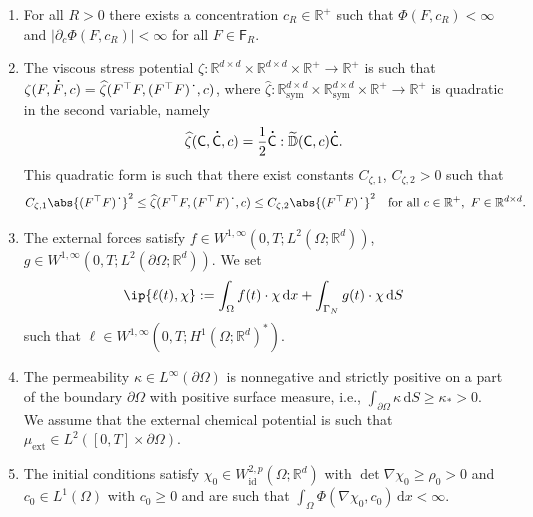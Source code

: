 \documentclass[a4paper,12pt]{article}
\newcommand{\ext}{\mathrm{ext}}
\newcommand{\R}{\mathbb{R}}
\newcommand{\pl}{\partial}
\newcommand{\wh}{\widehat}
\newcommand{\wt}{\widetilde}
\newcommand{\dx}{\mathrm{\,d}x}
\newcommand{\dd}{\mathrm{\,d}}
\newcommand{\dS}{\mathrm{\,d}S}
\newcommand{\id}{\mathrm{id}}
\newcommand\DT[1]{\mathchoice
                 {{\buildrel{\hspace*{.1em}\text{\LARGE.}}\over{#1}}}
                 {{\buildrel{\hspace*{.1em}\text{\Large.}}\over{#1}}}
                 {{\buildrel{\hspace*{.1em}\text{\large.}}\over{#1}}}
                 {{\buildrel{\hspace*{.1em}\text{\large.}}\over{#1}}}}
\renewcommand{\dot}{\DT}
\theoremstyle{plain}
\theoremstyle{definition}
\numberwithin{equation}{section}
\begin{document}
\begin{enumerate}[label=\emph{\bfseries (A\arabic*)}]
\begin{itemize}

\end{itemize}


%
%
%
%
%
%
%
%


%
%
%
%
%
%
 
%
%
%

\item \label{Assu:EnergyInitFin} For all $R>0$ there exists a concentration $c_R\in \R^+$ such that $\Phi(F,c_R)<\infty$ and $|\pl_c\Phi(F,c_R)|<\infty$ for all $F\in \mathsf{F}_R$.		
	
\item \label{Assu:ViscousStress} The viscous stress potential 
$\zeta:\R^{d\times d}\times \R^{d\times d}\times \R^+\to \R^+$ 
is such that 
$\zeta(F,\dot F,c) = \wh\zeta(F^\top F,(F^\top F)^{\dot{}} ,c)$, where $\wh\zeta:\R^{d\times d}_\text{sym} \times \R^{d\times d}_\text{sym}\times \R^+ \to \R^+$
is quadratic in the second variable, namely
\[
\wh\zeta(\mathsf{C},\dot{\mathsf{C}},c) 
= \frac{1}{2}\dot {\mathsf{C}}:\mathbb{\wt D}(\mathsf{C},c)\dot {\mathsf{C}}.
\]
This quadratic form is such that 
there exist constants $C_{\zeta,1}$, $C_{\zeta,2}>0$ such that
\[
C_{\zeta,1}\abs{(F^\top F)^{\dot{}} }^2 \leq \wh\zeta(F^\top F,(F^\top F)^{\dot{}},c) \leq C_{\zeta,2}\abs{(F^\top F)^{\dot{}} }^2 \quad \text{for all}\ c\in \R^+,~F\in \R^{d\times d}.
\]

\item \label{Assu:Loading}  The external forces satisfy $f\in W^{1,\infty}(0,T;L^{2}(\Omega;\R^d))$, $g\in W^{1,\infty}(0,T;L^{2}(\pl\Omega;\R^d))$. We set
\[
\ip{\ell(t),\chi} := \int_\Omega f(t)\cdot \chi\dx + 
\int_{\Gamma_N} g(t)\cdot\chi \dS
\] 
%
such that $\ell\in W^{1,\infty}(0,T;H^{1}(\Omega;\R^d)^*)$.


\item \label{Assu:Permeability} The permeability $\kappa \in L^\infty(\partial\Omega)$ is nonnegative and strictly positive on a part of the boundary $\pl\Omega$ with positive surface measure, i.e., $\int_{\pl\Omega}\kappa\dS \geq \kappa_* > 0$. We assume that the external chemical potential is such that $\mu_\ext\in L^2([0,T]{\times}\partial\Omega)$.

\item \label{Assu:RegularityInit} The initial conditions satisfy $\chi_0\in W^{2,p}_\id(\Omega;\R^d)$ with $\det\nabla\chi_0\geq \rho_0>0$ and $c_0\in L^1(\Omega)$ with $c_0\geq 0$ and are such that $\int_\Omega \Phi(\nabla\chi_0,c_0)\dd x< \infty$.
\end{enumerate}
	
\end{document}

